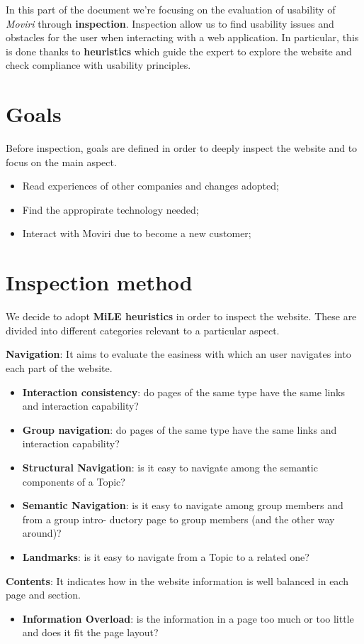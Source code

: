 In this part of the document we're focusing on the evaluation of usability of \textit{Moviri} through \textbf{inspection}. Inspection allow us to find usability issues and obstacles for the user when interacting with a web application. In particular, this is done thanks to \textbf{heuristics} which guide the expert to explore the website and check compliance with usability principles.
\section{Goals}
Before inspection, goals are defined in order to deeply inspect the website and to focus on the main aspect. 
\begin{itemize}
\item Read experiences of other companies and changes adopted;
\item Find the appropirate technology needed;
\item Interact with Moviri due to become a new customer;
\end{itemize}
\section{Inspection method}

We decide to adopt \textbf{MiLE heuristics} in order to inspect the website. These are divided into different categories relevant to a particular aspect.

\textbf{Navigation}: It aims to evaluate the easiness with which an user navigates into each part of the website.
\begin{itemize} 
\item \textbf{Interaction consistency}: do pages of the same type have the same links and interaction capability?
\item \textbf{Group navigation}: do pages of the same type have the same links and interaction capability?
\item \textbf{Structural Navigation}: is it easy to navigate among the semantic components of a Topic?
\item \textbf{Semantic Navigation}: is it easy to navigate among group members and from a group intro- ductory page to group members (and the other way around)?
\item \textbf{Landmarks}: is it easy to navigate from a Topic to a related one?
\end{itemize}

\textbf{Contents}: It indicates how in the website information is well balanced in each page and section.  
\begin{itemize}
\item \textbf{Information Overload}: is the information in a page too much or too little and does it fit the page layout?
\end{itemize}

